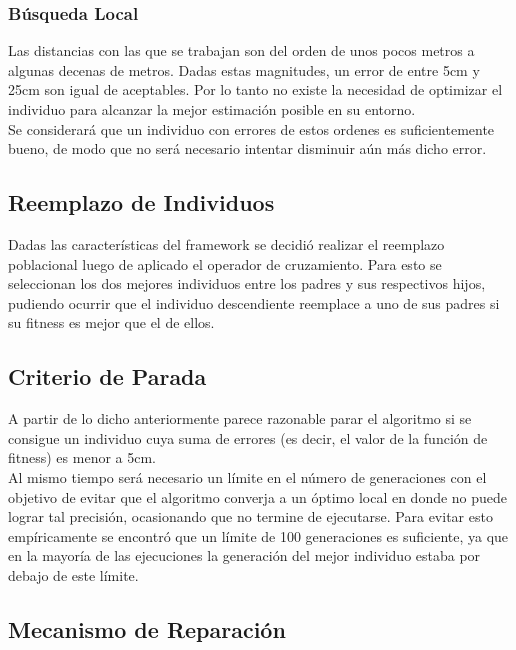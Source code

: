 \documentclass[journal]{IEEEtran}
\begin{document}
\subsubsection{Búsqueda Local}

Las distancias con las que se trabajan son del orden de unos pocos metros a algunas decenas de metros. Dadas estas magnitudes, un error de entre 5cm y 25cm son igual de aceptables. Por lo tanto no existe la necesidad de optimizar el individuo para alcanzar la mejor estimación posible en su entorno.\\

Se considerará que un individuo con errores de estos ordenes es suficientemente bueno, de modo que no será necesario intentar disminuir aún más dicho error.\\

\subsection{Reemplazo de Individuos}

Dadas las características del framework se decidió realizar el reemplazo poblacional luego de aplicado el operador de cruzamiento. Para esto se seleccionan los dos mejores individuos entre los padres y sus respectivos hijos, pudiendo ocurrir que el individuo descendiente reemplace a uno de sus padres si su fitness es mejor que el de ellos.\\

\subsection{Criterio de Parada}

A partir de lo dicho anteriormente parece razonable parar el algoritmo si se consigue un individuo cuya suma de errores (es decir, el valor de la función de fitness) es menor a 5cm.\\

Al mismo tiempo será necesario un límite en el número de generaciones con el objetivo de evitar que el algoritmo converja a un óptimo local en donde no puede lograr tal precisión, ocasionando que no termine de ejecutarse. Para evitar esto empíricamente se encontró que un límite de 100 generaciones es suficiente, ya que en la mayoría de las ejecuciones la generación del mejor individuo estaba por debajo de este límite.\\

\subsection{Mecanismo de Reparación}
\end{document}
